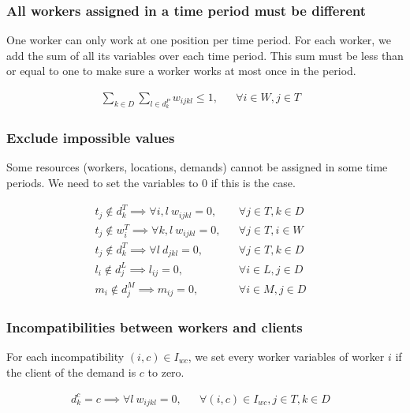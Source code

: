 \documentclass[../../thesis.tex]{subfiles}
\begin{document}
\subsubsection{All workers assigned in a time period must be different}

One worker can only work at one position per time period. For each worker, we add the sum of all its variables 
over each time period. This sum must be less than or equal to one to make sure a worker works at most once in the period.

\begin{align}
  \sum_{k \in D} \sum_{l \in d_k^P} w_{ijkl} \leq 1, && \forall i \in W, j \in T & \label{wc2} 
\end{align}


\subsubsection{Exclude impossible values}

Some resources (workers, locations, demands) cannot be assigned in some time periods. We need to set the variables to 0 if this is the case.

\begin{align}
  t_j \notin d^T_{k} \implies \forall i, l \ w_{ijkl} = 0,  && \forall j \in T , k \in D &\label{wc3} \\
  t_j \notin w^T_{i} \implies \forall k, l \ w_{ijkl} = 0, && \forall j \in T, i \in W &\label{wc4} \\
  t_j \notin d^T_{k} \implies \forall l \ d_{jkl} = 0,  && \forall j \in T , k \in D &\label{sc1} \\ 
  l_i \notin d^L_j \implies l_{ij} = 0, && \forall i \in L, j \in D& \label{lc1} \\ 
  m_i \notin d^M_j \implies m_{ij} = 0, && \forall i \in M, j \in D& \label{mc1} 
\end{align}


\subsubsection{Incompatibilities between workers and clients}

For each incompatibility $(i, c) \in I_{wc}$, we set every worker variables of worker $i$ if the client of the 
demand is $c$ to zero.

\begin{align}
  d^c_{k} = c \implies \forall l \ w_{ijkl} = 0, && \forall {(i, c) \in I_{wc}}, j \in T, k \in D &\label{wc6}
\end{align}
\end{document}
